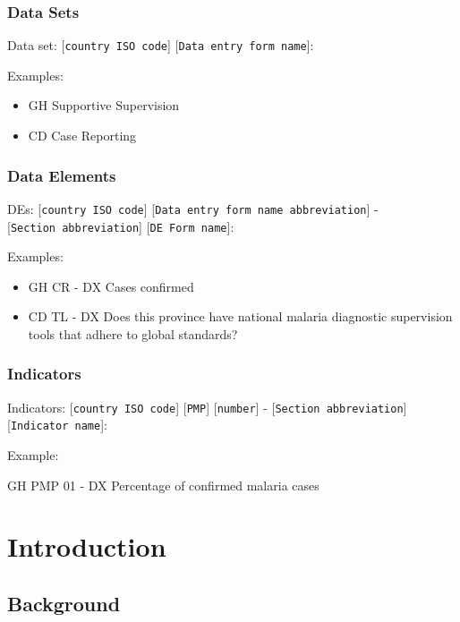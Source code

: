 \documentclass[]{book}
\providecommand{\tightlist}{%
  \setlength{\itemsep}{0pt}\setlength{\parskip}{0pt}}
\begin{document}
\hypertarget{data-sets}{%
\subsection{Data Sets}\label{data-sets}}

Data set: {[}\texttt{country\ ISO\ code}{]} {[}\texttt{Data\ entry\ form\ name}{]}:

Examples:

\begin{itemize}
\tightlist
\item
  GH Supportive Supervision
\item
  CD Case Reporting
\end{itemize}

\hypertarget{data-elements}{%
\subsection{Data Elements}\label{data-elements}}

DEs: {[}\texttt{country\ ISO\ code}{]} {[}\texttt{Data\ entry\ form\ name\ abbreviation}{]} - {[}\texttt{Section\ abbreviation}{]} {[}\texttt{DE\ Form\ name}{]}:

Examples:

\begin{itemize}
\tightlist
\item
  GH CR - DX Cases confirmed
\item
  CD TL - DX Does this province have national malaria diagnostic supervision tools that adhere to global standards?
\end{itemize}

\hypertarget{indicators}{%
\subsection{Indicators}\label{indicators}}

Indicators: {[}\texttt{country\ ISO\ code}{]} {[}\texttt{PMP}{]} {[}\texttt{number}{]} - {[}\texttt{Section\ abbreviation}{]} {[}\texttt{Indicator\ name}{]}:

Example:

GH PMP 01 - DX Percentage of confirmed malaria cases

\hypertarget{intro}{%
\chapter{Introduction}\label{intro}}

\hypertarget{background}{%
\section{Background}\label{background}}
\end{document}
